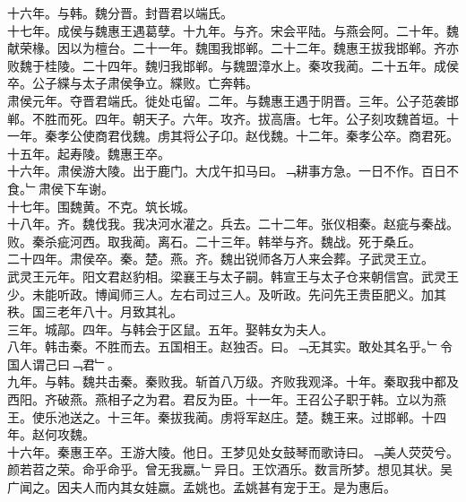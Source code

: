 \documentclass{zhvt-classic}
\begin{document}
\hspace*{2em}十六年。与韩。魏分晋。封晋君以端氏。\\
\hspace*{2em}十七年。成侯与魏惠王遇葛孽。十九年。与齐。宋会平陆。与燕会阿。二十年。魏献荣椽。因以为檀台。二十一年。魏围我邯郸。二十二年。魏惠王拔我邯郸。齐亦败魏于桂陵。二十四年。魏归我邯郸。与魏盟漳水上。秦攻我蔺。二十五年。成侯卒。公子緤与太子肃侯争立。緤败。亡奔韩。\\
\hspace*{2em}肃侯元年。夺晋君端氏。徙处屯留。二年。与魏惠王遇于阴晋。三年。公子范袭邯郸。不胜而死。四年。朝天子。六年。攻齐。拔高唐。七年。公子刻攻魏首垣。十一年。秦孝公使商君伐魏。虏其将公子卬。赵伐魏。十二年。秦孝公卒。商君死。十五年。起寿陵。魏惠王卒。\\
\hspace*{2em}十六年。肃侯游大陵。出于鹿门。大戊午扣马曰。﹁耕事方急。一日不作。百日不食。﹂肃侯下车谢。\\
\hspace*{2em}十七年。围魏黄。不克。筑长城。\\
\hspace*{2em}十八年。齐。魏伐我。我决河水灌之。兵去。二十二年。张仪相秦。赵疵与秦战。败。秦杀疵河西。取我蔺。离石。二十三年。韩举与齐。魏战。死于桑丘。\\
\hspace*{2em}二十四年。肃侯卒。秦。楚。燕。齐。魏出锐师各万人来会葬。子武灵王立。\\
\hspace*{2em}武灵王元年。阳文君赵豹相。梁襄王与太子嗣。韩宣王与太子仓来朝信宫。武灵王少。未能听政。博闻师三人。左右司过三人。及听政。先问先王贵臣肥义。加其秩。国三老年八十。月致其礼。\\
\hspace*{2em}三年。城鄗。四年。与韩会于区鼠。五年。娶韩女为夫人。\\
\hspace*{2em}八年。韩击秦。不胜而去。五国相王。赵独否。曰。﹁无其实。敢处其名乎。﹂令国人谓己曰﹁君﹂。\\
\hspace*{2em}九年。与韩。魏共击秦。秦败我。斩首八万级。齐败我观泽。十年。秦取我中都及西阳。齐破燕。燕相子之为君。君反为臣。十一年。王召公子职于韩。立以为燕王。使乐池送之。十三年。秦拔我蔺。虏将军赵庄。楚。魏王来。过邯郸。十四年。赵何攻魏。\\
\hspace*{2em}十六年。秦惠王卒。王游大陵。他日。王梦见处女鼓琴而歌诗曰。﹁美人荧荧兮。颜若苕之荣。命乎命乎。曾无我嬴。﹂异日。王饮酒乐。数言所梦。想见其状。吴广闻之。因夫人而内其女娃嬴。孟姚也。孟姚甚有宠于王。是为惠后。\\
\end{document}
